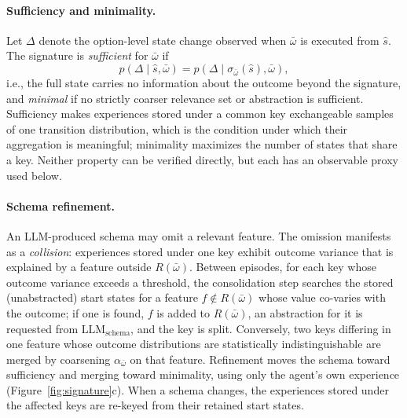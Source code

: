 \documentclass[11pt]{article}
\newcommand{\llm}[1]{\mathrm{LLM}_{\mathrm{#1}}}
\newcommand{\Rel}{R}
\newcommand{\shat}{\hat{s}}
\begin{document}
\paragraph{Sufficiency and minimality.}
Let $\Delta$ denote the option-level state change observed when $\bar\omega$ is executed from $\shat$. The signature is \emph{sufficient} for $\bar\omega$ if
\begin{equation}
p(\Delta\mid\shat,\bar\omega)=p(\Delta\mid\sigma_{\bar\omega}(\shat),\bar\omega),
\label{eq:sufficient}
\end{equation}
i.e., the full state carries no information about the outcome beyond the signature, and \emph{minimal} if no strictly coarser relevance set or abstraction is sufficient. Sufficiency makes experiences stored under a common key exchangeable samples of one transition distribution, which is the condition under which their aggregation is meaningful; minimality maximizes the number of states that share a key. Neither property can be verified directly, but each has an observable proxy used below.

\paragraph{Schema refinement.}
An LLM-produced schema may omit a relevant feature. The omission manifests as a \emph{collision}: experiences stored under one key exhibit outcome variance that is explained by a feature outside $\Rel(\bar\omega)$. Between episodes, for each key whose outcome variance exceeds a threshold, the consolidation step searches the stored (unabstracted) start states for a feature $f\notin\Rel(\bar\omega)$ whose value co-varies with the outcome; if one is found, $f$ is added to $\Rel(\bar\omega)$, an abstraction for it is requested from $\llm{schema}$, and the key is split. Conversely, two keys differing in one feature whose outcome distributions are statistically indistinguishable are merged by coarsening $\alpha_{\bar\omega}$ on that feature. Refinement moves the schema toward sufficiency and merging toward minimality, using only the agent's own experience (Figure~\ref{fig:signature}c). When a schema changes, the experiences stored under the affected keys are re-keyed from their retained start states.
\end{document}
